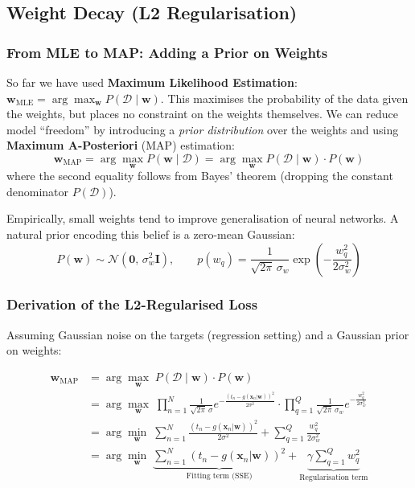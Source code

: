 \documentclass[11pt,a4paper]{article}
\newcommand{\term}[1]{\textcolor{DefGreen}{\textbf{#1}}}
\begin{document}
\subsection{Weight Decay (L2 Regularisation)}

\subsubsection{From MLE to MAP: Adding a Prior on Weights}

So far we have used \term{Maximum Likelihood Estimation}: $\mathbf{w}_{\mathrm{MLE}} = \arg\max_\mathbf{w} P(\mathcal{D} \mid \mathbf{w})$. This maximises the probability of the data given the weights, but places no constraint on the weights themselves. We can reduce model ``freedom'' by introducing a \emph{prior distribution} over the weights and using \term{Maximum A-Posteriori} (MAP) estimation:
\[
\mathbf{w}_{\mathrm{MAP}} = \arg\max_\mathbf{w} P(\mathbf{w} \mid \mathcal{D}) = \arg\max_\mathbf{w} P(\mathcal{D} \mid \mathbf{w}) \cdot P(\mathbf{w})
\]
where the second equality follows from Bayes' theorem (dropping the constant denominator $P(\mathcal{D})$).

Empirically, small weights tend to improve generalisation of neural networks. A natural prior encoding this belief is a zero-mean Gaussian:
\[
P(\mathbf{w}) \sim \mathcal{N}(\mathbf{0},\, \sigma_w^2 \mathbf{I}), \qquad
p(w_q) = \frac{1}{\sqrt{2\pi}\,\sigma_w}\exp\!\left(-\frac{w_q^2}{2\sigma_w^2}\right)
\]

\subsubsection{Derivation of the L2-Regularised Loss}

Assuming Gaussian noise on the targets (regression setting) and a Gaussian prior on weights:

\begin{align*}
\mathbf{w}_{\mathrm{MAP}} &= \arg\max_\mathbf{w}\; P(\mathcal{D} \mid \mathbf{w})\cdot P(\mathbf{w}) \\
&= \arg\max_\mathbf{w}\; \prod_{n=1}^N \frac{1}{\sqrt{2\pi}\,\sigma} e^{-\frac{(t_n - g(\mathbf{x}_n|\mathbf{w}))^2}{2\sigma^2}}
\cdot \prod_{q=1}^Q \frac{1}{\sqrt{2\pi}\,\sigma_w} e^{-\frac{w_q^2}{2\sigma_w^2}} \\
&= \arg\min_\mathbf{w}\; \sum_{n=1}^N \frac{(t_n - g(\mathbf{x}_n|\mathbf{w}))^2}{2\sigma^2}
+ \sum_{q=1}^Q \frac{w_q^2}{2\sigma_w^2} \\
&= \arg\min_\mathbf{w}\; \underbrace{\sum_{n=1}^N (t_n - g(\mathbf{x}_n|\mathbf{w}))^2}_{\text{Fitting term (SSE)}}
+ \underbrace{\gamma \sum_{q=1}^Q w_q^2}_{\text{Regularisation term}}
\end{align*}
\end{document}

